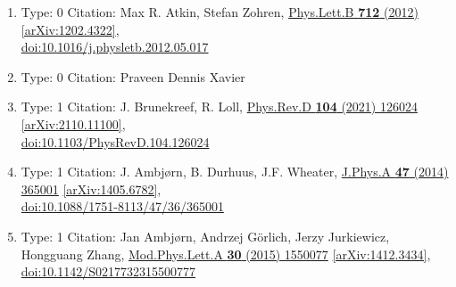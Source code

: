 \documentclass[a4paper,10pt]{article}
\begin{document}
\begin{enumerate}
\begin{enumerate}
  \item Type: 0 Citation: Max R. Atkin, Stefan Zohren, \href{https://www.doi.org/10.1016/j.physletb.2012.05.017}{Phys.Lett.B {\bf 712} (2012) }  \href{https://arxiv.org/abs/1202.4322}{[arXiv:1202.4322]},\\\href{https://www.doi.org/10.1016/j.physletb.2012.05.017}{doi:10.1016/j.physletb.2012.05.017}
  \item Type: 0 Citation: Praveen Dennis Xavier
  \item Type: 1 Citation: J. Brunekreef, R. Loll, \href{https://www.doi.org/10.1103/PhysRevD.104.126024}{Phys.Rev.D {\bf 104} (2021) 126024}  \href{https://arxiv.org/abs/2110.11100}{[arXiv:2110.11100]},\\\href{https://www.doi.org/10.1103/PhysRevD.104.126024}{doi:10.1103/PhysRevD.104.126024}
  \item Type: 1 Citation: J. Ambjørn, B. Durhuus, J.F. Wheater, \href{https://www.doi.org/10.1088/1751-8113/47/36/365001}{J.Phys.A {\bf 47} (2014) 365001}  \href{https://arxiv.org/abs/1405.6782}{[arXiv:1405.6782]},\\\href{https://www.doi.org/10.1088/1751-8113/47/36/365001}{doi:10.1088/1751-8113/47/36/365001}
  \item Type: 1 Citation: Jan Ambjørn, Andrzej Görlich, Jerzy Jurkiewicz, Hongguang Zhang, \href{https://www.doi.org/10.1142/S0217732315500777}{Mod.Phys.Lett.A {\bf 30} (2015) 1550077}  \href{https://arxiv.org/abs/1412.3434}{[arXiv:1412.3434]},\\\href{https://www.doi.org/10.1142/S0217732315500777}{doi:10.1142/S0217732315500777}

\end{enumerate}
\end{enumerate}
\end{document}
